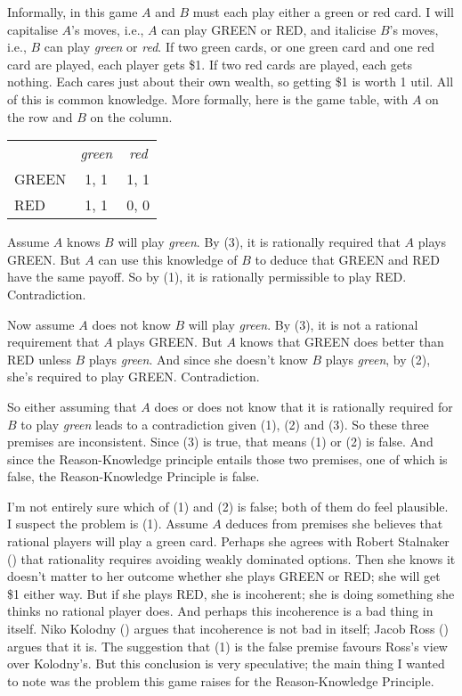 \documentclass[
  11pt,
  letterpaper,
  DIV=11,
  numbers=noendperiod,
  twoside]{scrartcl}
\begin{document}
Informally, in this game \(A\) and \(B\) must each play either a green
or red card. I will capitalise \(A\)'s moves, i.e., \(A\) can play GREEN
or RED, and italicise \(B\)'s moves, i.e., \(B\) can play \emph{green}
or \emph{red}. If two green cards, or one green card and one red card
are played, each player gets \$1. If two red cards are played, each gets
nothing. Each cares just about their own wealth, so getting \$1 is worth
1 util. All of this is common knowledge. More formally, here is the game
table, with \(A\) on the row and \(B\) on the column.

\begin{longtable}[]{@{}lcc@{}}
\toprule\noalign{}
\endhead
\bottomrule\noalign{}
\endlastfoot
& \emph{green} & \emph{red} \\
GREEN & 1, 1 & 1, 1 \\
RED & 1, 1 & 0, 0 \\
\end{longtable}

Assume \(A\) knows \(B\) will play \emph{green}. By (3), it is
rationally required that \(A\) plays GREEN. But \(A\) can use this
knowledge of \(B\) to deduce that GREEN and RED have the same payoff. So
by (1), it is rationally permissible to play RED. Contradiction.

Now assume \(A\) does not know \(B\) will play \emph{green}. By (3), it
is not a rational requirement that \(A\) plays GREEN. But \(A\) knows
that GREEN does better than RED unless \(B\) plays \emph{green}. And
since she doesn't know \(B\) plays \emph{green}, by (2), she's required
to play GREEN. Contradiction.

So either assuming that \(A\) does or does not know that it is
rationally required for \(B\) to play \emph{green} leads to a
contradiction given (1), (2) and (3). So these three premises are
inconsistent. Since (3) is true, that means (1) or (2) is false. And
since the Reason-Knowledge principle entails those two premises, one of
which is false, the Reason-Knowledge Principle is false.

I'm not entirely sure which of (1) and (2) is false; both of them do
feel plausible. I suspect the problem is (1). Assume \(A\) deduces from
premises she believes that rational players will play a green card.
Perhaps she agrees with Robert Stalnaker
() that rationality requires avoiding
weakly dominated options. Then she knows it doesn't matter to her
outcome whether she plays GREEN or RED; she will get \$1 either way. But
if she plays RED, she is incoherent; she is doing something she thinks
no rational player does. And perhaps this incoherence is a bad thing in
itself. Niko Kolodny () argues that
incoherence is not bad in itself; Jacob Ross
() argues that it is. The suggestion that
(1) is the false premise favours Ross's view over Kolodny's. But this
conclusion is very speculative; the main thing I wanted to note was the
problem this game raises for the Reason-Knowledge Principle.
\end{document}

